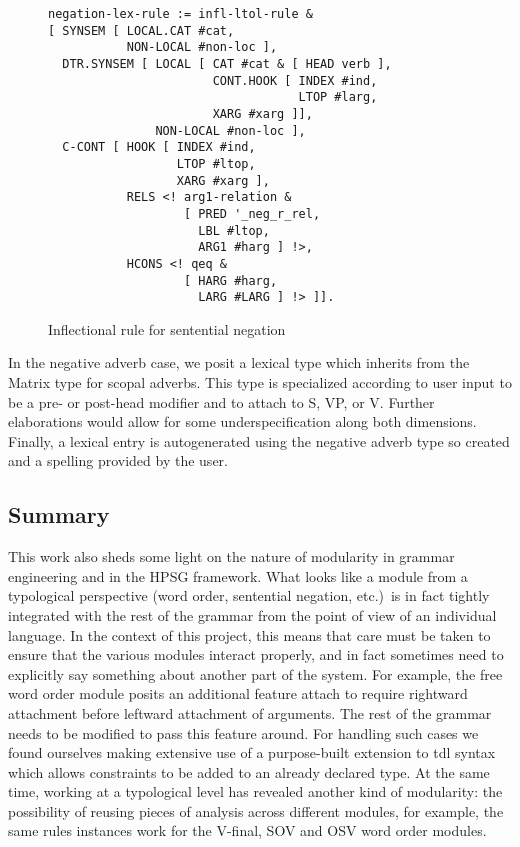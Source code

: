 \documentclass[11pt]{article}
\begin{document}
\begin{figure}[ht]
{\scriptsize
\begin{verbatim}
negation-lex-rule := infl-ltol-rule &
[ SYNSEM [ LOCAL.CAT #cat,
           NON-LOCAL #non-loc ],
  DTR.SYNSEM [ LOCAL [ CAT #cat & [ HEAD verb ],
                       CONT.HOOK [ INDEX #ind,
                                   LTOP #larg,
                       XARG #xarg ]],
               NON-LOCAL #non-loc ],
  C-CONT [ HOOK [ INDEX #ind,
                  LTOP #ltop,
                  XARG #xarg ],
           RELS <! arg1-relation &
                   [ PRED '_neg_r_rel,
                     LBL #ltop,
                     ARG1 #harg ] !>,
           HCONS <! qeq &
                   [ HARG #harg,
                     LARG #LARG ] !> ]].
\end{verbatim}
}
\caption{Inflectional rule for sentential negation}
\label{negrulefig}
\end{figure}

In the negative adverb case, we posit a lexical type which inherits
from the Matrix type for scopal adverbs.  This type is specialized
according to user input to be a pre- or post-head modifier and to
attach to S, VP, or V.  Further elaborations would allow for some
underspecification along both dimensions.  Finally, a lexical entry is
autogenerated using the negative adverb type so created and a spelling
provided by the user.

\subsection{Summary}

This work also sheds some light on the nature of modularity in grammar
engineering and in the HPSG framework.  What looks like a module from
a typological perspective (word order, sentential negation, etc.)\ is
in fact tightly integrated with the rest of the grammar from the point
of view of an individual language.  In the context of this project,
this means that care must be taken to ensure that the various modules
interact properly, and in fact sometimes need to explicitly say
something about another part of the system.  For example, the free
word order module posits an additional feature {\sc attach} to require
rightward attachment before leftward attachment of arguments.  The
rest of the grammar needs to be modified to pass this feature around.
For handling such cases we found ourselves making extensive use of a
purpose-built extension to tdl syntax which allows constraints to be
added to an already declared type.  At the same time, working at a
typological level has revealed another kind of modularity: the
possibility of reusing pieces of analysis across different modules,
for example, the same rules instances work for the V-final, SOV and
OSV word order modules.
\end{document}
